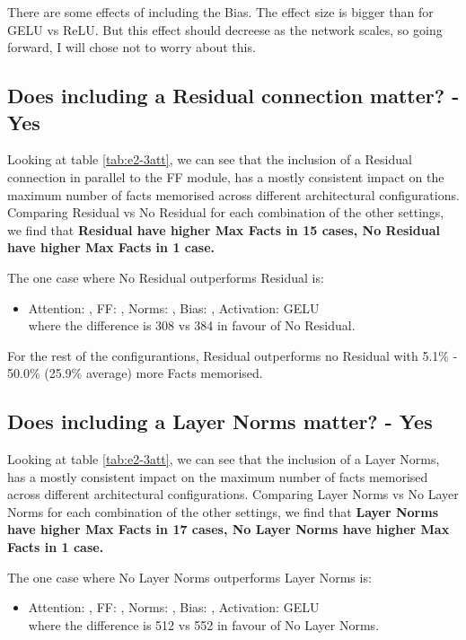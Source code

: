 \documentclass[11pt,a4paper]{article}
\newcommand{\cmark}{{\color{green!70!black}\ding{51}}}
\newcommand{\xmark}{{\color{red}\ding{55}}}
\begin{document}
There are some effects of including the Bias. The effect size is bigger than for GELU vs ReLU. But this effect should decreese as the network scales, so going forward, I will chose not to worry about this.

\subsection{Does including a Residual connection matter? - Yes}

Looking at table \ref{tab:e2-3att}, we can see that the inclusion of a Residual connection in parallel to the FF module, has a mostly consistent impact on the maximum number of facts memorised across different architectural configurations. Comparing Residual vs No Residual for each combination of the other settings, we find that \textbf{Residual have higher Max Facts in 15 cases, No Residual have higher Max Facts in 1 case.}

The one case where No Residual outperforms Residual is:
\begin{itemize}
    \item Attention: \cmark, FF: \cmark, Norms: \xmark, Bias: \cmark, Activation: GELU \\ where the difference is 308 vs 384 in favour of No Residual.
\end{itemize}

For the rest of the configurantions, Residual outperforms no Residual with 5.1\% - 50.0\% (25.9\% average) more Facts memorised. 



\subsection{Does including a Layer Norms matter? - Yes}

Looking at table \ref{tab:e2-3att}, we can see that the inclusion of a Layer Norms, has a mostly consistent impact on the maximum number of facts memorised across different architectural configurations. Comparing Layer Norms vs No Layer Norms for each combination of the other settings, we find that \textbf{Layer Norms have higher Max Facts in 17 cases, No Layer Norms have higher Max Facts in 1 case.}

The one case where No Layer Norms outperforms Layer Norms is:
\begin{itemize}
    \item Attention: \xmark, FF: \cmark, Norms: \xmark, Bias: \xmark, Activation: GELU \\ where the difference is 512 vs 552 in favour of No Layer Norms.
\end{itemize}
\end{document}
